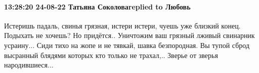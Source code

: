  
 
 
 
 

\paragraph{13:28:20 24-08-22 Татьяна Соколоваreplied to Любовь}

Истеришь падаль, свинья грязная, истери истери, чуешь уже близкий конец.
Подыхать не хочешь? Но придётся.. Уничтожим ваш грязный лживый свинарник
усраину... Сиди тихо на жопе и не тявкай, шавка безпородная. Вы тупой сброд
высранный блядями которых кто только не трахал,.. Зверье от зверья
народившиеся...
